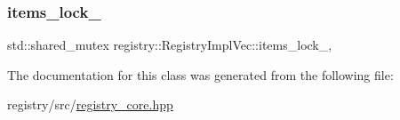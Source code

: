 \subsubsection{\texorpdfstring{items\+\_\+lock\+\_\+}{items\_lock\_}}
{\footnotesize\ttfamily std\+::shared\+\_\+mutex registry\+::\+Registry\+Impl\+Vec\+::items\+\_\+lock\+\_\+\hspace{0.3cm}{\ttfamily [mutable]}, {\ttfamily [private]}}



The documentation for this class was generated from the following file\+:\begin{DoxyCompactItemize}
\item 
registry/src/\hyperlink{registry__core_8hpp}{registry\+\_\+core.\+hpp}\end{DoxyCompactItemize}

